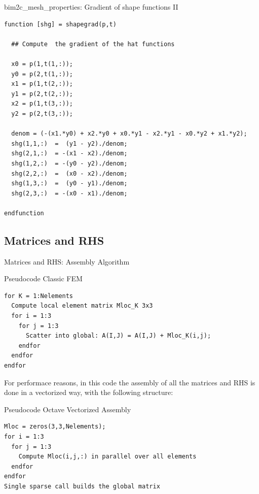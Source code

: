 \documentclass[aspectratio=54,xcolor=dvipsnames]{beamer}
\begin{document}
\begin{frame}[fragile]{bim2c\_mesh\_properties: Gradient of shape functions II}
\scriptsize
\begin{lstlisting}[firstnumber=427]
function [shg] = shapegrad(p,t)
  
  ## Compute  the gradient of the hat functions
  
  x0 = p(1,t(1,:));
  y0 = p(2,t(1,:));
  x1 = p(1,t(2,:));
  y1 = p(2,t(2,:));
  x2 = p(1,t(3,:));
  y2 = p(2,t(3,:));

  denom = (-(x1.*y0) + x2.*y0 + x0.*y1 - x2.*y1 - x0.*y2 + x1.*y2);
  shg(1,1,:)  =  (y1 - y2)./denom;
  shg(2,1,:)  = -(x1 - x2)./denom;
  shg(1,2,:)  = -(y0 - y2)./denom;
  shg(2,2,:)  =  (x0 - x2)./denom;
  shg(1,3,:)  =  (y0 - y1)./denom;
  shg(2,3,:)  = -(x0 - x1)./denom;

endfunction
\end{lstlisting}
\end{frame}

\subsection{Matrices and RHS}
\begin{frame}[fragile]{Matrices and RHS: Assembly Algorithm}
\scriptsize
\begin{block}{Pseudocode Classic FEM}
\begin{verbatim}
for K = 1:Nelements
  Compute local element matrix Mloc_K 3x3
  for i = 1:3
    for j = 1:3
      Scatter into global: A(I,J) = A(I,J) + Mloc_K(i,j);
    endfor
  endfor
endfor
\end{verbatim}
\end{block}

For performace reasons, in this code the assembly of all the matrices and RHS is done in a vectorized way, with the following structure:
\begin{block}{Pseudocode Octave Vectorized Assembly}
\begin{verbatim}
Mloc = zeros(3,3,Nelements);
for i = 1:3
  for j = 1:3
    Compute Mloc(i,j,:) in parallel over all elements
  endfor
endfor
Single sparse call builds the global matrix
\end{verbatim}
\end{block}
\end{frame}
\end{document}
